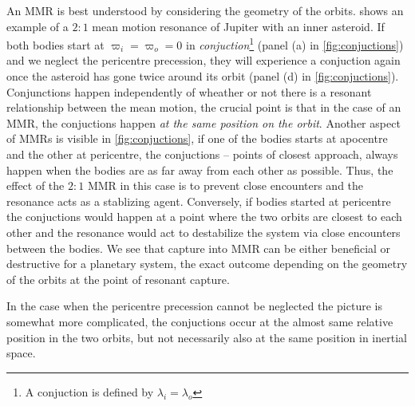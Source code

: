 \documentclass[twoside,openright,titlepage,numbers=noenddot,headinclude,%
                footinclude=true,cleardoublepage=empty,abstractoff, 
                BCOR=5mm,paper=a4,fontsize=11pt,%
                american,%
                ]{scrreprt}%
\begin{document}
An MMR is best understood by considering the geometry of the 
orbits.  shows an example of a $2:1$
mean motion resonance of Jupiter with an inner asteroid. 
If both bodies start at $\varpi_i=\varpi_o=0$ in 
\emph{conjuction}\footnote{A conjuction is defined by 
$\lambda_i=\lambda_o$} (panel (a) in \cref{fig:conjuctions}) and we 
neglect the pericentre precession, they will experience
a conjuction again once the asteroid has gone twice 
around its orbit (panel (d) in \cref{fig:conjuctions}). Conjunctions
happen independently of wheather or not there is a resonant
relationship between the mean motion, the crucial point
is that in the case of an MMR, the conjuctions happen
\emph{at the same position on the orbit}. Another aspect of MMRs
is visible in \cref{fig:conjuctions}, if one of the bodies starts
at apocentre and the other at pericentre, the conjuctions --
points of closest approach, always happen when the bodies 
are as far away from each other as possible. Thus, the effect
of the $2:1$ MMR in this case is to prevent close encounters and 
the resonance acts as a stablizing agent. Conversely, if bodies
started at pericentre the conjuctions would happen at a point 
where the two orbits are closest to each other and the resonance
would act to destabilize the system via close encounters between
the bodies. We see that capture into MMR can be either beneficial
or destructive for a planetary system, the exact outcome
depending on the geometry of the orbits at the point of resonant
capture. 

In the case when the pericentre precession cannot be neglected the
picture is somewhat more complicated, the conjuctions occur 
at the  almost same relative position in the two orbits, but not 
necessarily also at the same position in inertial space.
\end{document}
